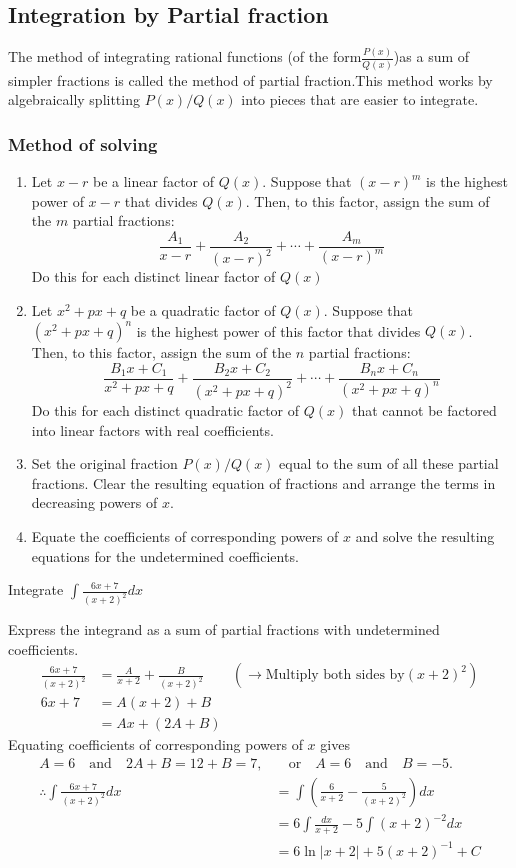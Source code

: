 \subsection{Integration by Partial fraction}
The method of integrating rational functions (of the form\quad$\frac{P(x)}{Q(x)}$)\quad as a sum of simpler fractions is called the method of partial fraction.This method  works by algebraically splitting $P(x) / Q(x)$ into pieces that are easier to integrate.
\subsubsection{Method of solving}
\begin{enumerate}
	\item Let $x-r$ be a linear factor of $Q(x)$. Suppose that $(x-r)^{m}$ is the highest power of $x-r$ that divides $Q(x)$. Then, to this factor, assign the sum of the $m$ partial fractions:
	$$
	\frac{A_{1}}{x-r}+\frac{A_{2}}{(x-r)^{2}}+\cdots+\frac{A_{m}}{(x-r)^{m}}
	$$
	Do this for each distinct linear factor of $Q(x)$
	\item Let $x^{2}+p x+q$ be a quadratic factor of $Q(x)$. Suppose that $\left(x^{2}+p x+q\right)^{n}$ is the highest power of this factor that divides $Q(x)$. Then, to this factor, assign the sum of the $n$ partial fractions:
	$$
	\frac{B_{1} x+C_{1}}{x^{2}+p x+q}+\frac{B_{2} x+C_{2}}{\left(x^{2}+p x+q\right)^{2}}+\cdots+\frac{B_{n} x+C_{n}}{\left(x^{2}+p x+q\right)^{n}}
	$$
	Do this for each distinct quadratic factor of $Q(x)$ that cannot be factored into linear factors with real coefficients.
	\item Set the original fraction $P(x) / Q(x)$ equal to the sum of all these partial fractions. Clear the resulting equation of fractions and arrange the terms in decreasing powers of $x$.
	\item Equate the coefficients of corresponding powers of $x$ and solve the resulting equations for the undetermined coefficients.
\end{enumerate}
\begin{exercise}
	Integrate $
	\int \frac{6 x+7}{(x+2)^{2}} d x
	$
\end{exercise}
\begin{answer}
	Express the integrand as a sum of partial fractions with undetermined coefficients.
	\begin{align*}
	\frac{6 x+7}{(x+2)^{2}}&=\frac{A}{x+2}+\frac{B}{(x+2)^{2}}\qquad(\rightarrow\text{Multiply both sides by} (x+2)^{2})\\
	6 x+7 &=A(x+2)+B \\
	&=A x+(2 A+B)
	\end{align*}
	{Equating coefficients of corresponding powers of $x$ gives}
	\begin{align*}
	A=6 \quad \text{and} \quad 2 A+B=12+B=7, &\quad \text{or} \quad A=6 \quad \text{and} \quad B=-5.\\
	\therefore \int \frac{6 x+7}{(x+2)^{2}} d x &=\int\left(\frac{6}{x+2}-\frac{5}{(x+2)^{2}}\right) d x \\
	&=6 \int \frac{d x}{x+2}-5 \int(x+2)^{-2} d x \\
	&=6 \ln |x+2|+5(x+2)^{-1}+C
	\end{align*}
\end{answer}

